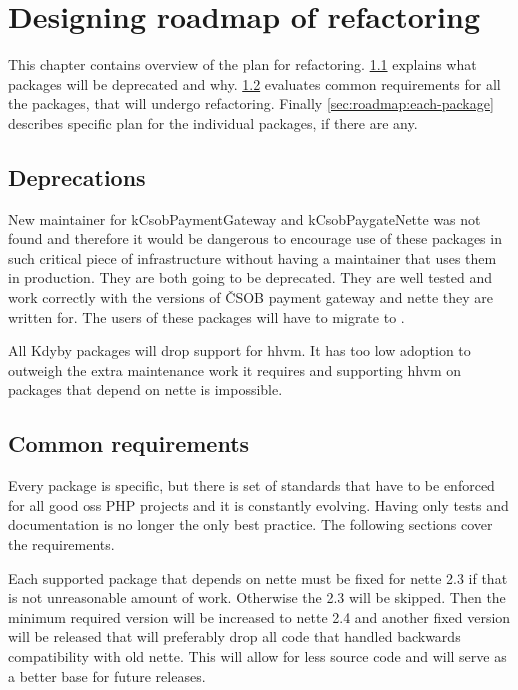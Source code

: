 \chapter{Designing roadmap of refactoring}

This chapter contains overview of the plan for refactoring. \ref{sec:roadmap:deprecations} explains what packages will be deprecated and why. \ref{sec:roadmap:common} evaluates common requirements for all the packages, that will undergo refactoring. Finally \ref{sec:roadmap:each-package} describes specific plan for the individual packages, if there are any.

\section{Deprecations} \label{sec:roadmap:deprecations}

New maintainer for \gls{kCsobPaymentGateway} and \gls{kCsobPaygateNette} was not found and therefore it would be dangerous to encourage use of these packages in such critical piece of infrastructure without having a maintainer that uses them in production. They are both going to be deprecated. They are well tested and work correctly with the versions of ČSOB payment gateway and \gls{nette} they are written for. The users of these packages will have to migrate to .

All Kdyby packages will drop support for \gls{hhvm}. It has too low adoption to outweigh the extra maintenance work it requires and supporting \gls{hhvm} on packages that depend on \gls{nette} is impossible.

\section{Common requirements} \label{sec:roadmap:common}

Every package is specific, but there is set of standards that have to be enforced for all good \gls{oss} PHP projects and it is constantly evolving. Having only tests and documentation is no longer the only best practice. The following sections cover the requirements.


Each supported package that depends on \gls{nette} must be fixed for \gls{nette} 2.3 if that is not unreasonable amount of work. Otherwise the 2.3 will be skipped. Then the minimum required version will be increased to \gls{nette} 2.4 and another fixed version will be released that will preferably drop all code that handled backwards compatibility with old \gls{nette}. This will allow for less source code and will serve as a better base for future releases.

